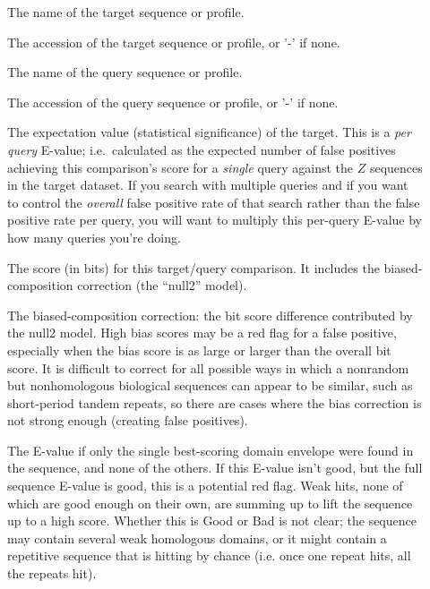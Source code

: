 \begin{description}
\item[]
  The name of the target sequence or profile. 

\item[]
  The accession of the target sequence or profile, or '-' if none.

\item[] 
  The name of the query sequence or profile.

\item[]
  The accession of the query sequence or profile, or '-' if none.

\item[] The expectation value
  (statistical significance) of the target.  This is a \emph{per
  query} E-value; i.e.\ calculated as the expected number of false
  positives achieving this comparison's score for a \emph{single}
  query against the $Z$ sequences in the target dataset.  If you
  search with multiple queries and if you want to control the
  \emph{overall} false positive rate of that search rather than the
  false positive rate per query, you will want to multiply this
  per-query E-value by how many queries you're doing.

\item[] 
  The score (in bits) for this target/query comparison. It includes
  the biased-composition correction (the ``null2'' model). 

\item[] The biased-composition
  correction: the bit score difference contributed by the null2
  model. High bias scores may be a red flag for a false positive,
  especially when the bias score is as large or larger than the
  overall bit score. It is difficult to correct for all possible ways
  in which a nonrandom but nonhomologous biological sequences can
  appear to be similar, such as short-period tandem repeats, so there
  are cases where the bias correction is not strong enough (creating
  false positives).

\item[] The E-value if only the
  single best-scoring domain envelope were found in the sequence, and
  none of the others. If this E-value isn't good, but the full
  sequence E-value is good, this is a potential red flag.  Weak hits,
  none of which are good enough on their own, are summing up to lift
  the sequence up to a high score. Whether this is Good or Bad is not
  clear; the sequence may contain several weak homologous domains, or
  it might contain a repetitive sequence that is hitting by chance
  (i.e. once one repeat hits, all the repeats hit).


\end{description}
